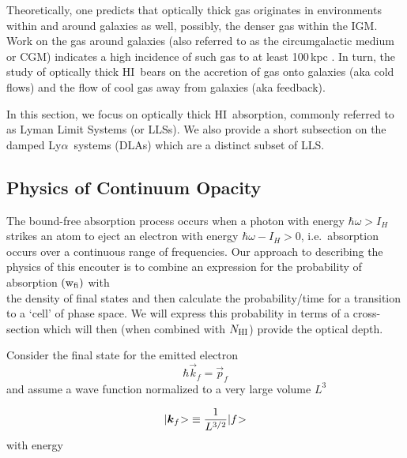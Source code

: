 \documentclass[graybox]{svmult}
\newcommand{\HI}{H{\sc I}}
\def\lya{Ly$\alpha$}
\def\ket#1{{|#1\negmedspace>}}
\newcommand{\mnhi}{N_{\rm HI}}
\newcommand{\nhi}{$\mnhi$}
\begin{document}
Theoretically, one predicts that optically thick gas originates 
in environments within and around galaxies as well, possibly,
the denser gas within the IGM.  Work on the gas
around galaxies (also referred to as the circumgalactic medium
or CGM) indicates a high incidence of such gas to at least 100\,kpc
\cite{bb91,QPQ5,p+17}.
In turn, the study of optically thick \HI\ bears
on the accretion of gas onto galaxies (aka cold flows) and
the flow of cool gas away from galaxies (aka feedback).

In this section, we focus on optically thick \HI\ absorption,
commonly referred to as Lyman Limit Systems (or LLSs).  We also
provide a short subsection on the damped \lya\ systems (DLAs)
which are a distinct subset of LLS.

\subsection{Physics of Continuum Opacity}

The bound-free absorption process occurs when a  
photon with energy $\hbar \omega > I_H$ strikes an atom 
to eject an electron with energy $\hbar\omega - I_H > 0$,
i.e.\ absorption occurs over a continuous range of frequencies.
Our approach to describing the physics of this encouter
is to combine an expression for the probability of absorption
$({\rm w_{fi}})$ with \\ the density of final states
and then calculate the probability/time for a transition to a 
`cell' of phase space.
We will express this probability in terms of a cross-section
which will then (when combined with \nhi)
provide the optical depth.

Consider the final state for the emitted electron
\begin{equation}
\hbar \vec k_f = \vec p_f
\end{equation}
and	assume a wave function normalized to a very large volume $L^3$

\begin{equation}
\ket{\vec k_f} \equiv \frac{1}{L^{3/2}} \ket{f}
\end{equation}
with energy  
\end{document}
